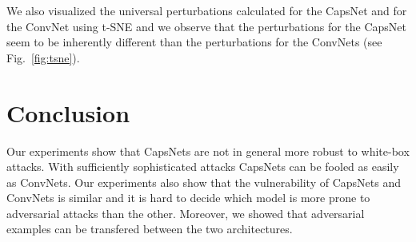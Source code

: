 \documentclass{article}
\begin{document}
We also visualized the universal perturbations calculated for the
CapsNet and for the ConvNet using t-SNE \cite{tsne} and we observe
that the perturbations for the CapsNet seem to be inherently different
than the perturbations for the ConvNets (see Fig.~\ref{fig:tsne}).

\section{Conclusion}
Our experiments show that CapsNets are not in general more robust to
white-box attacks. With sufficiently sophisticated attacks CapsNets
can be fooled as easily as ConvNets.  Our experiments also show that
the vulnerability of CapsNets and ConvNets is similar and it is hard
to decide which model is more prone to adversarial attacks than the
other. Moreover, we showed that adversarial examples can be transfered
between the two architectures.






\end{document}
